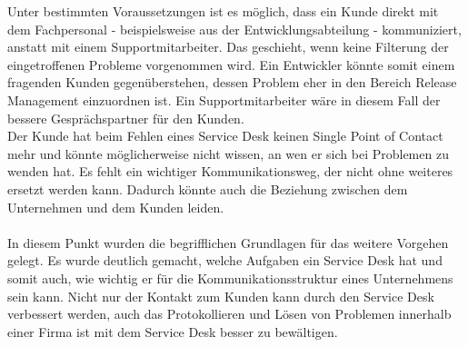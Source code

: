 \noindent
Unter bestimmten Voraussetzungen ist es möglich, dass ein Kunde direkt mit dem Fachpersonal - beispielsweise aus der Entwicklungsabteilung - kommuniziert, anstatt mit einem Supportmitarbeiter. Das geschieht, wenn keine Filterung der eingetroffenen Probleme vorgenommen wird. Ein Entwickler könnte somit einem fragenden Kunden gegenüberstehen, dessen Problem eher in den Bereich Release Management einzuordnen ist. Ein Supportmitarbeiter wäre in diesem Fall der bessere Gesprächspartner für den Kunden.\\

\noindent
Der Kunde hat beim Fehlen eines Service Desk keinen Single Point of Contact mehr und könnte möglicherweise nicht wissen, an wen er sich bei Problemen zu wenden hat. Es fehlt ein wichtiger Kommunikationsweg, der nicht ohne weiteres ersetzt werden kann. Dadurch könnte auch die Beziehung zwischen dem Unternehmen und dem Kunden leiden.\\\\



\noindent
In diesem Punkt wurden die begrifflichen Grundlagen für das weitere Vorgehen gelegt. Es wurde deutlich gemacht, welche Aufgaben ein Service Desk hat und somit auch, wie wichtig er für die Kommunikationsstruktur eines Unternehmens sein kann. Nicht nur der Kontakt zum Kunden kann durch den Service Desk verbessert werden, auch das Protokollieren und Lösen von Problemen innerhalb einer Firma ist mit dem Service Desk besser zu bewältigen.\newline









   


 
